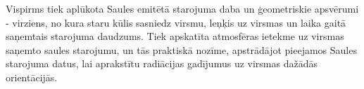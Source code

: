 Vispirms tiek aplūkota Saules emitētā starojuma daba un ģeometriskie apsvērumi - virziens, no kura staru kūlis sasniedz virsmu, leņķis uz virsmas un laika gaitā saņemtais starojuma daudzums. Tiek apskatīta atmosfēras ietekme uz virsmas saņemto saules starojumu, un tās praktiskā nozīme, apstrādājot pieejamos Saules starojuma datus, lai aprakstītu radiācijas gadījumus uz virsmas dažādās orientācijās.